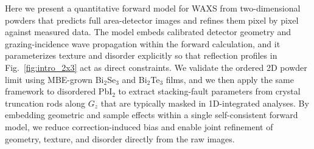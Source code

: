 Here we present a quantitative forward model for WAXS from two-dimensional powders that predicts full area-detector images and refines them pixel by pixel against measured data.\cite{Sinha1988,Renaud2009,Breiby2008,Nikolaev2025} The model embeds calibrated detector geometry and grazing-incidence wave propagation within the forward calculation, and it parameterizes texture and disorder explicitly so that reflection profiles in Fig.~\ref{fig:intro_2x3} act as direct constraints.\cite{Sinha1988,Renaud2009,SmilgiesBlasini2007,Savikhin2020} We validate the ordered 2D powder limit using MBE-grown Bi$_2$Se$_3$ and Bi$_2$Te$_3$ films, and we then apply the same framework to disordered PbI$_2$ to extract stacking-fault parameters from crystal truncation rods along $G_z$ that are typically masked in 1D-integrated analyses.\cite{Arendse2023,Jerng2013,Treacy1991,CasasCabanas2016} By embedding geometric and sample effects within a single self-consistent forward model, we reduce correction-induced bias and enable joint refinement of geometry, texture, and disorder directly from the raw images.\cite{Hexemer2015,Reus2024,Nikolaev2025}



\pagebreak 

